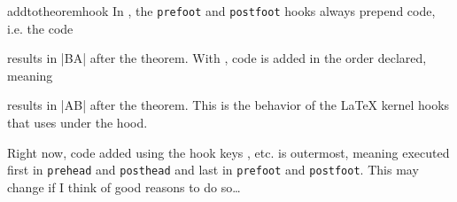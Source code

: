 \documentclass{ltxdoc}
\newcommand{\hook}{\texttt}
\begin{document}
\begin{docCommand}{addtotheoremhook}
In , the \hook{prefoot} and \hook{postfoot} hooks always prepend code, i.e. the code
\begin{dispListing}
\end{dispListing}
results in |BA| after the theorem. With , code is added in the order declared, meaning
\begin{dispListing}
\end{dispListing}
results in |AB| after the theorem. This is the behavior of the \LaTeX{} kernel hooks that  uses under the hood.

Right now, code added using the hook keys , etc. is outermost, meaning executed first in \hook{prehead} and \hook{posthead} and last in \hook{prefoot} and \hook{postfoot}. This may change if I think of good reasons to do so\dots
\end{docCommand}

\printindex
\end{document}
